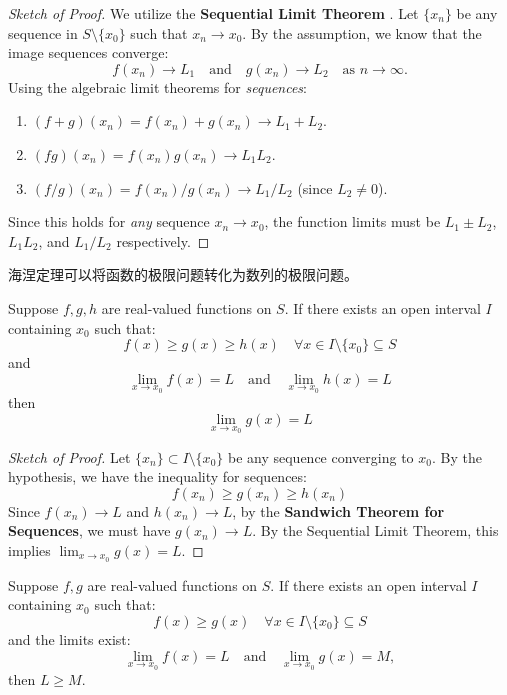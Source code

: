 \documentclass[
	UTF-8,
	11pt, %
	a4paper, %
]{LegrandOrangeBook}
\begin{document}
    \begin{proof}[Sketch of Proof]
    We utilize the \textbf{Sequential Limit Theorem} .
    Let $\{x_n\}$ be any sequence in $S \setminus \{x_0\}$ such that $x_n \to x_0$.
    By the assumption, we know that the image sequences converge:
    \[ f(x_n) \to L_1 \quad \text{and} \quad g(x_n) \to L_2 \quad \text{as } n \to \infty. \]
    Using the algebraic limit theorems for \textit{sequences}:
    \begin{enumerate}
        \item $(f+g)(x_n) = f(x_n) + g(x_n) \to L_1 + L_2$.
        \item $(fg)(x_n) = f(x_n)g(x_n) \to L_1 L_2$.
        \item $(f/g)(x_n) = f(x_n)/g(x_n) \to L_1/L_2$ (since $L_2 \neq 0$).
    \end{enumerate}
    Since this holds for \textit{any} sequence $x_n \to x_0$, the function limits must be $L_1 \pm L_2$, $L_1 L_2$, and $L_1/L_2$ respectively.
    \end{proof}

    \begin{remark}
        海涅定理可以将函数的极限问题转化为数列的极限问题。
    \end{remark}

    \begin{theorem}
    Suppose $f, g, h$ are real-valued functions on $S$. If there exists an open interval $I$ containing $x_0$ such that:
    \[ f(x) \ge g(x) \ge h(x) \quad \forall x \in I \setminus \{x_0\} \subseteq S \]
    and
    \[ \lim_{x \to x_0} f(x) = L \quad \text{and} \quad \lim_{x \to x_0} h(x) = L \]
    then
    \[ \lim_{x \to x_0} g(x) = L \]
    \end{theorem}

    \begin{proof}[Sketch of Proof]
    Let $\{x_n\} \subset I \setminus \{x_0\}$ be any sequence converging to $x_0$.
    By the hypothesis, we have the inequality for sequences:
    \[ f(x_n) \ge g(x_n) \ge h(x_n) \]
    Since $f(x_n) \to L$ and $h(x_n) \to L$, by the \textbf{Sandwich Theorem for Sequences}, we must have $g(x_n) \to L$.
    By the Sequential Limit Theorem, this implies $\lim_{x \to x_0} g(x) = L$.
    \end{proof}

    \newpage

    \begin{theorem}
    Suppose $f, g$ are real-valued functions on $S$. If there exists an open interval $I$ containing $x_0$ such that:
    \[ f(x) \ge g(x) \quad \forall x \in I \setminus \{x_0\} \subseteq S \]
    and the limits exist:
    \[ \lim_{x \to x_0} f(x) = L \quad \text{and} \quad \lim_{x \to x_0} g(x) = M, \]
    then $L \ge M$.
    \end{theorem}
\end{document}
